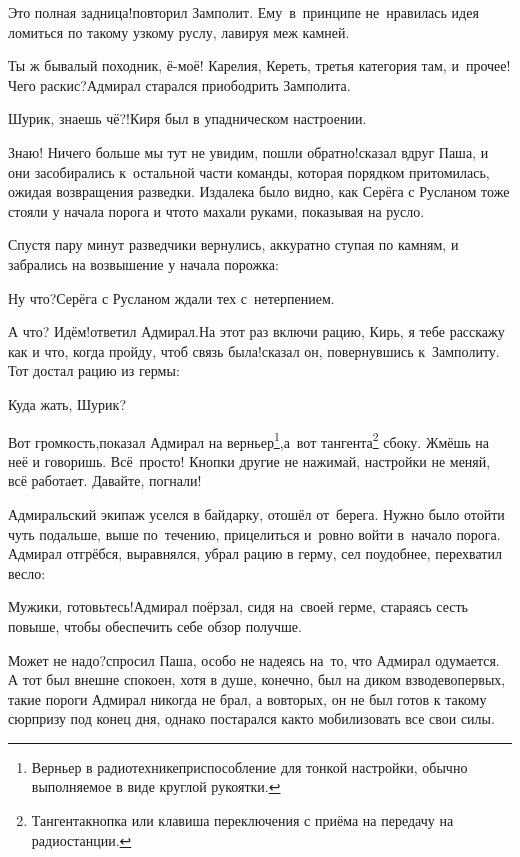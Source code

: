 \diagdash Это полная задница!\mdash повторил Замполит. Ему~в~принципе не~нравилась идея ломиться по такому узкому руслу, лавируя меж камней.

\diagdash Ты ж бывалый походник, ё-моё! Карелия, Кереть, третья категория там, и~прочее! Чего раскис?\mdash Адмирал старался приободрить Замполита.

\diagdash Шурик, знаешь чё?!\mdash Киря был в упадническом настроении.

\diagdash Знаю! Ничего больше мы тут не увидим, пошли обратно!\mdash сказал вдруг Паша, и они засобирались к~остальной части команды, которая порядком притомилась, ожидая возвращения разведки. Издалека было видно, как Серёга с Русланом тоже стояли у начала порога и что\sdash то махали руками, показывая на русло.

Спустя пару минут разведчики вернулись, аккуратно ступая по камням, и забрались на возвышение у начала порожка:

\diagdash Ну что?\mdash Серёга с Русланом ждали тех с~нетерпением.

\diagdash А что? Идём!\mdash ответил Адмирал.\mdash На этот раз включи рацию, Кирь, я тебе расскажу как и что, когда пройду, чтоб связь была!\mdash сказал он, повернувшись к~Замполиту. Тот достал рацию из гермы:

\diagdash Куда жать, Шурик?

\renewcommand*{\thefootnote}{\arabic{footnote}}
\setcounter{footnote}{0}
\diagdash Вот громкость,\mdash показал Адмирал на верньер\footnote{Верньер в радиотехнике\mdash приспособление для тонкой настройки, обычно выполняемое в виде круглой рукоятки.},\mdash а~вот тангента\footnote{Тангента\mdash кнопка или клавиша переключения с приёма на передачу на радиостанции.} сбоку. Жмёшь на неё и говоришь. Всё~просто! Кнопки другие не нажимай, настройки не меняй, всё работает. Давайте, погнали!

Адмиральский экипаж уселся в байдарку, отошёл от~берега. Нужно было отойти чуть подальше, выше по~течению, прицелиться и~ровно войти в~начало порога. Адмирал отгрёбся, выравнялся, убрал рацию в герму, сел поудобнее, перехватил весло: 

\diagdash Мужики, готовьтесь!\mdash Адмирал поёрзал, сидя на~своей герме, стараясь сесть повыше, чтобы обеспечить себе обзор получше.

\diagdash Может не надо?\mdash спросил Паша, особо не надеясь на~то, что Адмирал одумается. А тот был внешне спокоен, хотя в душе, конечно, был на диком взводе\mdash во\sdash первых, такие пороги Адмирал никогда не брал, а во\sdash вторых, он не был готов к такому сюрпризу под конец дня, однако постарался как\sdash то мобилизовать все свои силы.


